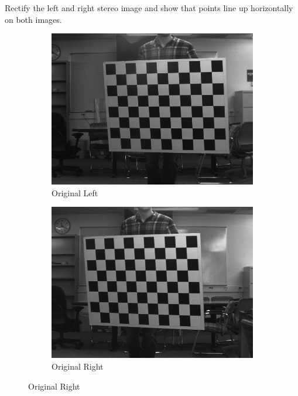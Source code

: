 \documentclass[12pt,a4paper,final]{article}
\begin{document}
Rectify the left and right stereo image and show that points line up horizontally on both images.

\begin{figure}[H]
\centering
\begin{subfigure}{.5\textwidth}
  \centering
  \includegraphics[width=.9\linewidth]{origRemapL}
  \caption{Original Left}
  \label{fig:sub1}
\end{subfigure}%
\begin{subfigure}{.5\textwidth}
  \centering
  \includegraphics[width=.9\linewidth]{origRemapR}
  \caption{Original Right}
  \label{fig:sub2}
\end{subfigure}
\label{fig:test}
\end{figure}
\end{document}
